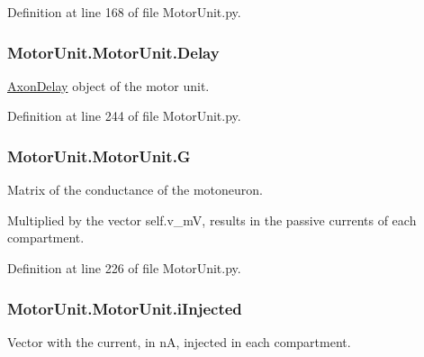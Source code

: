 Definition at line 168 of file Motor\-Unit.\-py.

\hypertarget{class_motor_unit_1_1_motor_unit_abe82ffa1e293d10225b67870a962eab8}{
\subsubsection[{Delay}]{\setlength{\rightskip}{0pt plus 5cm}Motor\-Unit.\-Motor\-Unit.\-Delay}}\label{class_motor_unit_1_1_motor_unit_abe82ffa1e293d10225b67870a962eab8}


\hyperlink{namespace_axon_delay}{Axon\-Delay} object of the motor unit. 



Definition at line 244 of file Motor\-Unit.\-py.

\hypertarget{class_motor_unit_1_1_motor_unit_a9b9f157ab92b47470ca7ec6bd3473dd3}{
\subsubsection[{G}]{\setlength{\rightskip}{0pt plus 5cm}Motor\-Unit.\-Motor\-Unit.\-G}}\label{class_motor_unit_1_1_motor_unit_a9b9f157ab92b47470ca7ec6bd3473dd3}


Matrix of the conductance of the motoneuron. 

Multiplied by the vector self.\-v\-\_\-m\-V, results in the passive currents of each compartment. 

Definition at line 226 of file Motor\-Unit.\-py.

\hypertarget{class_motor_unit_1_1_motor_unit_a06045eca379d38892670a491dbac0829}{
\subsubsection[{i\-Injected}]{\setlength{\rightskip}{0pt plus 5cm}Motor\-Unit.\-Motor\-Unit.\-i\-Injected}}\label{class_motor_unit_1_1_motor_unit_a06045eca379d38892670a491dbac0829}


Vector with the current, in n\-A, injected in each compartment. 



